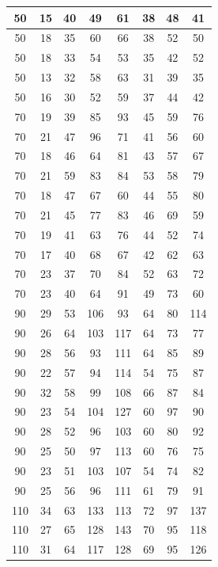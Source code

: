 \begin{longtable}[c]{|c|c|c|c|c|c|c|c|}
50  & 15 & 40 & 49  & 61  & 38  & 48  & 41  \\ \hline
50  & 18 & 35 & 60  & 66  & 38  & 52  & 50  \\ \hline
50  & 18 & 33 & 54  & 53  & 35  & 42  & 52  \\ \hline
50  & 13 & 32 & 58  & 63  & 31  & 39  & 35  \\ \hline
50  & 16 & 30 & 52  & 59  & 37  & 44  & 42  \\ \hline
70  & 19 & 39 & 85  & 93  & 45  & 59  & 76  \\ \hline
70  & 21 & 47 & 96  & 71  & 41  & 56  & 60  \\ \hline
70  & 18 & 46 & 64  & 81  & 43  & 57  & 67  \\ \hline
70  & 21 & 59 & 83  & 84  & 53  & 58  & 79  \\ \hline
70  & 18 & 47 & 67  & 60  & 44  & 55  & 80  \\ \hline
70  & 21 & 45 & 77  & 83  & 46  & 69  & 59  \\ \hline
70  & 19 & 41 & 63  & 76  & 44  & 52  & 74  \\ \hline
70  & 17 & 40 & 68  & 67  & 42  & 62  & 63  \\ \hline
70  & 23 & 37 & 70  & 84  & 52  & 63  & 72  \\ \hline
70  & 23 & 40 & 64  & 91  & 49  & 73  & 60  \\ \hline
90  & 29 & 53 & 106 & 93  & 64  & 80  & 114 \\ \hline
90  & 26 & 64 & 103 & 117 & 64  & 73  & 77  \\ \hline
90  & 28 & 56 & 93  & 111 & 64  & 85  & 89  \\ \hline
90  & 22 & 57 & 94  & 114 & 54  & 75  & 87  \\ \hline
90  & 32 & 58 & 99  & 108 & 66  & 87  & 84  \\ \hline
90  & 23 & 54 & 104 & 127 & 60  & 97  & 90  \\ \hline
90  & 28 & 52 & 96  & 103 & 60  & 80  & 92  \\ \hline
90  & 25 & 50 & 97  & 113 & 60  & 76  & 75  \\ \hline
90  & 23 & 51 & 103 & 107 & 54  & 74  & 82  \\ \hline
90  & 25 & 56 & 96  & 111 & 61  & 79  & 91  \\ \hline
110 & 34 & 63 & 133 & 113 & 72  & 97  & 137 \\ \hline
110 & 27 & 65 & 128 & 143 & 70  & 95  & 118 \\ \hline
110 & 31 & 64 & 117 & 128 & 69  & 95  & 126 \\ \hline

\end{longtable}
